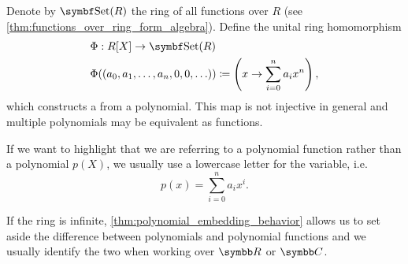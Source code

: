 \begin{definition}\label{def:polynomial_function}
  Denote by \( \Cat{Set}(R) \) the ring of all functions over \( R \) (see \cref{thm:functions_over_ring_form_algebra}). Define the unital ring homomorphism
  \begin{align*}
    &\Phi: R[X] \to \Cat{Set}(R) \\
    &\Phi((a_0, a_1, \ldots, a_n, 0, 0, \ldots)) \coloneqq \left( x \to \sum_{i=0}^n a_i x^n \right),
  \end{align*}
  which constructs a  from a polynomial. This map is not injective in general and multiple polynomials may be equivalent as functions.

  If we want to highlight that we are referring to a polynomial function rather than a polynomial \( p(X) \), we usually use a lowercase letter for the variable, i.e.
  \begin{equation*}
    p(x) = \sum_{i=0}^n a_i x^i.
  \end{equation*}

  If the ring is infinite, \cref{thm:polynomial_embedding_behavior} allows us to set aside the difference between polynomials and polynomial functions and we usually identify the two when working over \( \R \) or \( \C \).
\end{definition}
